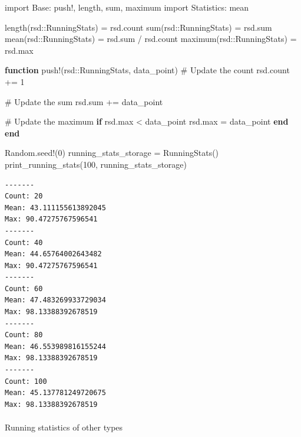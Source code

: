 \documentclass[
]{article}
\makeatletter
\let\oldparagraph\paragraph
\renewcommand{\paragraph}{
    \@ifstar
      \xxxParagraphStar
      \xxxParagraphNoStar
  }
\newcommand{\xxxParagraphStar}[1]{\oldparagraph*{#1}\mbox{}}
\newcommand{\xxxParagraphNoStar}[1]{\oldparagraph{#1}\mbox{}}
\newenvironment{Shaded}{\begin{snugshade}}{\end{snugshade}}
\newcommand{\BuiltInTok}[1]{\textcolor[rgb]{0.00,0.23,0.31}{#1}}
\newcommand{\CommentTok}[1]{\textcolor[rgb]{0.37,0.37,0.37}{#1}}
\newcommand{\ControlFlowTok}[1]{\textcolor[rgb]{0.00,0.23,0.31}{\textbf{#1}}}
\newcommand{\DataTypeTok}[1]{\textcolor[rgb]{0.68,0.00,0.00}{#1}}
\newcommand{\FloatTok}[1]{\textcolor[rgb]{0.68,0.00,0.00}{#1}}
\newcommand{\FunctionTok}[1]{\textcolor[rgb]{0.28,0.35,0.67}{#1}}
\newcommand{\ImportTok}[1]{\textcolor[rgb]{0.00,0.46,0.62}{#1}}
\newcommand{\KeywordTok}[1]{\textcolor[rgb]{0.00,0.23,0.31}{\textbf{#1}}}
\newcommand{\NormalTok}[1]{\textcolor[rgb]{0.00,0.23,0.31}{#1}}
\newcommand{\OperatorTok}[1]{\textcolor[rgb]{0.37,0.37,0.37}{#1}}
\makeatother
\begin{document}
\begin{Shaded}
\begin{Highlighting}[]
\ImportTok{import} \BuiltInTok{Base}\NormalTok{: push!, length, sum, maximum}
\ImportTok{import} \BuiltInTok{Statistics}\NormalTok{: mean}

\FunctionTok{length}\NormalTok{(rsd}\OperatorTok{::}\DataTypeTok{RunningStats}\NormalTok{) }\OperatorTok{=}\NormalTok{ rsd.count}
\FunctionTok{sum}\NormalTok{(rsd}\OperatorTok{::}\DataTypeTok{RunningStats}\NormalTok{) }\OperatorTok{=}\NormalTok{ rsd.sum}
\FunctionTok{mean}\NormalTok{(rsd}\OperatorTok{::}\DataTypeTok{RunningStats}\NormalTok{) }\OperatorTok{=}\NormalTok{ rsd.sum }\OperatorTok{/}\NormalTok{ rsd.count}
\FunctionTok{maximum}\NormalTok{(rsd}\OperatorTok{::}\DataTypeTok{RunningStats}\NormalTok{) }\OperatorTok{=}\NormalTok{ rsd.max}

\KeywordTok{function} \FunctionTok{push!}\NormalTok{(rsd}\OperatorTok{::}\DataTypeTok{RunningStats}\NormalTok{, data\_point)}
   \CommentTok{\# Update the count}
\NormalTok{   rsd.count }\OperatorTok{+=} \FloatTok{1}

   \CommentTok{\# Update the sum}
\NormalTok{   rsd.sum }\OperatorTok{+=}\NormalTok{ data\_point}

   \CommentTok{\# Update the maximum}
   \ControlFlowTok{if}\NormalTok{ rsd.max }\OperatorTok{\textless{}}\NormalTok{ data\_point}
\NormalTok{   rsd.max }\OperatorTok{=}\NormalTok{ data\_point}
   \ControlFlowTok{end}
\KeywordTok{end}

\BuiltInTok{Random}\NormalTok{.}\FunctionTok{seed!}\NormalTok{(}\FloatTok{0}\NormalTok{)}
\NormalTok{running\_stats\_storage }\OperatorTok{=} \FunctionTok{RunningStats}\NormalTok{()}
\FunctionTok{print\_running\_stats}\NormalTok{(}\FloatTok{100}\NormalTok{, running\_stats\_storage)}
\end{Highlighting}
\end{Shaded}

\begin{verbatim}
-------
Count: 20
Mean: 43.111155613892045
Max: 90.47275767596541
-------
Count: 40
Mean: 44.65764002643482
Max: 90.47275767596541
-------
Count: 60
Mean: 47.483269933729034
Max: 98.13388392678519
-------
Count: 80
Mean: 46.553989816155244
Max: 98.13388392678519
-------
Count: 100
Mean: 45.137781249720675
Max: 98.13388392678519
\end{verbatim}

\paragraph{Running statistics of other
types}\label{running-statistics-of-other-types}
\end{document}
